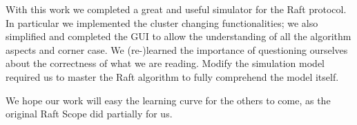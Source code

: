 With this work we completed a great and useful simulator for the Raft protocol.
In particular we implemented the cluster changing functionalities;
we also simplified and completed the GUI to allow the understanding of all
the algorithm aspects and corner case.
We (re-)learned the importance of questioning ourselves about the correctness
of what we are reading.
Modify the simulation model required us to master the Raft algorithm to fully
comprehend the model itself.

We hope our work will easy the learning curve for the others to come,
as the original Raft Scope did partially for us.
